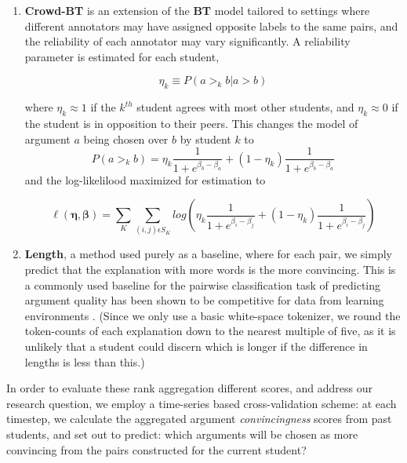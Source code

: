 \documentclass[acmsmall]{acmart}
\begin{document}
\begin{enumerate}
	\item \textbf{Crowd-BT} \cite{chen_pairwise_2013} is an extension of the 
	\textbf{BT} model tailored to settings where different annotators may have 
	assigned opposite labels to the same pairs, and the reliability of each 
	annotator may vary significantly. 
	A reliability parameter is estimated for each student, 
	
	$$
	\eta_k \equiv P(a >_k b | a >b )
	$$

	where $\eta_k \approx 1$ if the $k^{th}$ student agrees with most other 
	students, and $\eta_k \approx 0$ if the student is in opposition to their 
	peers.
	This changes the model of argument $a$ being chosen over $b$ by student $k$ 
	to 
	$$
	P(a >_k b) = 
	\eta_k \frac{1}{1+e^{\beta_b-\beta_a}} + (1-\eta_k) 
	\frac{1}{1+e^{\beta_b-\beta_a}}
	$$
	and the log-likelilood maximized for estimation to 
	
	$$
	\ell(\boldsymbol{\eta},\boldsymbol{\beta})=\sum_{K}\sum_{(i,j)\epsilon 
	S_K}^{} 
	log(\eta_k\frac{1}{1+e^{\beta_i - \beta_j}} + 
	(1-\eta_k)\frac{1}{1+e^{\beta_i - \beta_j}})
	$$
	
	\item \textbf{Length}, a method used purely as a baseline, where for each 
	pair, we simply predict that the explanation with more words is the more 
	convincing.
	This is a commonly used baseline  for the pairwise classification task of 
	predicting argument quality \cite{toledo_automatic_2019} has been shown to 
	be competitive for data from learning environments 
	\cite{bhatnagar_learnersourcing_2020}.
	(Since we only use a basic white-space tokenizer, we round the token-counts 
	of each explanation down to the nearest multiple of five, as it is unlikely 
	that a student could discern which is longer if the difference in lengths 
	is less than this.)
\end{enumerate}

In order to evaluate these rank aggregation different scores, and address 
our research question, we employ a time-series based cross-validation scheme:
at each timestep, we calculate the aggregated argument \textit{convincingness} 
scores from past students, and set out to predict: which arguments will be 
chosen as more convincing from the pairs constructed for the current student?  
\end{document}
